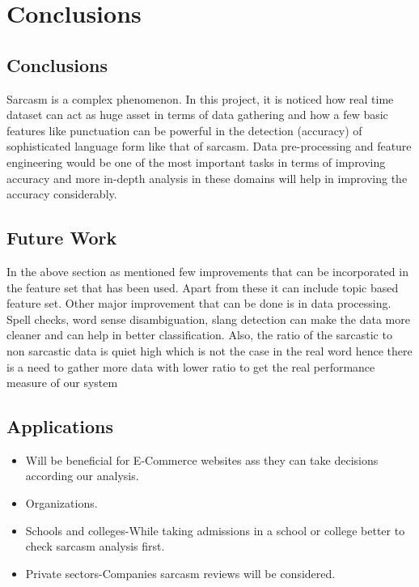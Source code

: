 \documentclass[oneside,a4paper,12pt]{book}
\begin{document}
\chapter{Conclusions}
\section{Conclusions}
Sarcasm is a complex phenomenon. In this project, it is noticed how real time dataset can act as huge asset in terms of data gathering and how a few basic features
like punctuation can be powerful in the detection (accuracy) of sophisticated language
form like that of sarcasm. Data pre-processing and feature engineering would be one of
the most important tasks in terms of improving accuracy and more in-depth analysis in
these domains will help in improving the accuracy considerably.
\section{Future Work}
In the above section as mentioned few improvements that can be incorporated in the
feature set that has been used. Apart from these it can include topic based feature set.
Other major improvement that can be done is in data processing. Spell checks, word
sense disambiguation, slang detection can make the data more cleaner and can help in
better classification. Also, the ratio of the sarcastic to non sarcastic data is quiet high
which is not the case in the real word hence there is a need to gather more data with lower ratio 
to get the real performance measure of our system
\section{Applications}
\begin{itemize}
    \item Will be beneficial for E-Commerce websites ass they can take decisions according our analysis.
    \item Organizations. 
    \item Schools and colleges-While taking admissions in a school or college better to check sarcasm analysis first.
    \item Private sectors-Companies sarcasm reviews will be considered.
\end{itemize}
\newpage
\appendix
\end{document}

